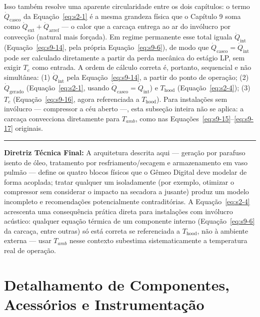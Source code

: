\documentclass[12pt,a4paper]{article}
\numberwithin{equation}{section}
\numberwithin{table}{section}
\numberwithin{figure}{section}
\begin{document}
{	Isso também resolve uma aparente circularidade entre os dois capítulos: o termo $\dot{Q}_{\text{casco}}$ da Equação~\eqref{eq:s2-1} é a mesma grandeza física que o Capítulo 9 soma como $\dot{Q}_{\text{ext}} + \dot{Q}_{\text{arref}}$ — o calor que a carcaça entrega ao ar do invólucro por convecção (natural mais forçada). Em regime permanente esse total iguala $\dot{Q}_{\text{int}}$ (Equação~\eqref{eq:s9-14}, pela própria Equação~\eqref{eq:s9-6}), de modo que $\dot{Q}_{\text{casco}} = \dot{Q}_{\text{int}}$ pode ser calculado diretamente a partir da perda mecânica do estágio LP, sem exigir $T_c$ como entrada. A ordem de cálculo correta é, portanto, sequencial e não simultânea: (1) $\dot{Q}_{\text{int}}$ pela Equação~\eqref{eq:s9-14}, a partir do ponto de operação; (2) $\dot{Q}_{\text{gerado}}$ (Equação~\eqref{eq:s2-1}, usando $\dot{Q}_{\text{casco}}=\dot{Q}_{\text{int}}$) e $T_{\text{hood}}$ (Equação~\eqref{eq:s2-4}); (3) $T_c$ (Equação~\eqref{eq:s9-16}, agora referenciada a $T_{\text{hood}}$). Para instalações sem invólucro — compressor a céu aberto —, esta subseção inteira não se aplica: a carcaça convecciona diretamente para $T_{amb}$, como nas Equações~\eqref{eq:s9-15}--\eqref{eq:s9-17} originais.

	\vspace{1em}
	\hrule
	\vspace{1em}

	\textbf{Diretriz Técnica Final:} A arquitetura descrita aqui — geração por parafuso isento de óleo, tratamento por resfriamento/secagem e armazenamento em vaso pulmão — define os quatro blocos físicos que o Gêmeo Digital deve modelar de forma acoplada; tratar qualquer um isoladamente (por exemplo, otimizar o compressor sem considerar o impacto na secadora a jusante) produz um modelo incompleto e recomendações potencialmente contraditórias. A Equação~\eqref{eq:s2-4} acrescenta uma consequência prática direta para instalações com invólucro acústico: qualquer equação térmica de um componente interno (Equação~\eqref{eq:s9-6} da carcaça, entre outras) só está correta se referenciada a $T_{\text{hood}}$, não à ambiente externa — usar $T_{amb}$ nesse contexto subestima sistematicamente a temperatura real de operação.

	
	
	\clearpage
	\section{\textbf{Detalhamento de Componentes, Acessórios e Instrumentação}}

}
\end{document}

